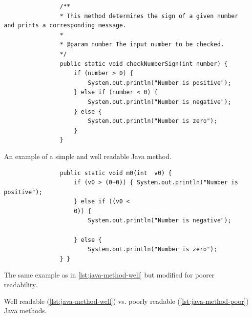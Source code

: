 \documentclass[%
class=scrreprt,
chapterprefix=false,%
open=right,%
twoside=true,%
paper=a4,%
logofile={Logo\_zentral\_farbig\_EN.png},%
thesistype=master,%
UKenglish,%
]{se2thesis}
\theoremstyle{definition}
\begin{document}
	\begin{listing}[p]
		\begin{sublisting}{\linewidth}
			\begin{verbatim}
				/**
				* This method determines the sign of a given number and prints a corresponding message.
				*
				* @param number The input number to be checked.
				*/
				public static void checkNumberSign(int number) {
					if (number > 0) {
						System.out.println("Number is positive");
					} else if (number < 0) {
						System.out.println("Number is negative");
					} else {
						System.out.println("Number is zero");
					}
				}
			\end{verbatim}
			\caption{An example of a simple and well readable Java method.}
			\label{lst:java-method-well}
		\end{sublisting}
		
		\begin{sublisting}{\linewidth}
			\begin{verbatim}
				public static void m0(int  v0) {
					if (v0 > (0+0)) { System.out.println("Number is positive");
					} else if ((v0 <
					0)) {
						System.out.println("Number is negative");
						
					} else {
						System.out.println("Number is zero");
				} }
			\end{verbatim}
			\caption{The same example as in \autoref{lst:java-method-well} but modified for poorer readability.}
			\label{lst:java-method-poor}
		\end{sublisting}
		\caption{Well readable (\autoref{lst:java-method-well}) vs. poorly readable (\autoref{lst:java-method-poor}) Java methods.}
		\label{lst:java-method}
	\end{listing}
	
\end{document}
